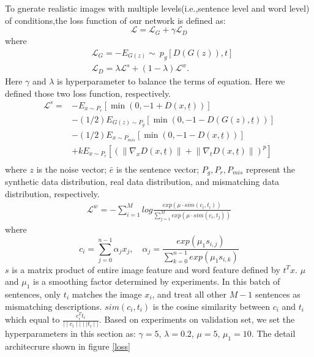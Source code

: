 \documentclass[runningheads, orivec]{llncs}
\begin{document}
To gnerate realistic images with multiple levels(i.e.,sentence level and word level) of conditions,the loss function of our network is defined as:
\begin{equation}
    \mathcal{L} =\mathcal{L}_{G}+ \gamma \mathcal{L}_{D}
\end{equation}
where
\begin{equation}
\begin{aligned}
        &\mathcal{L} _{G} = -E_{G(z)}\sim\ p_{g}[D(G(z)),t]\\
        &\mathcal{L}_{D} = \lambda \mathcal{L}^{s}+(1-\lambda) \mathcal{L}^{w}.
\end{aligned}
\end{equation}
Here $\gamma$  and $\lambda$ is hyperparameter to balance the terms of equation. 
Here we defined those two loss function, respectively.
\begin{equation}
\begin{aligned}
\mathcal{L}^{s}= & - E _{x \sim P _r}[\min (0,-1+D(x, \underline{t}))] \\
& -(1 / 2) E _{G(z) \sim P _g}[\min (0,-1-D(G(z), \underline{t}))] \\
& -(1 / 2) E _{x \sim P _{m i s}}[\min (0,-1-D(x, \underline{t}))] \\
& +k E _{x \sim P _r}\left[\left(\left\|\nabla_x D(x, \underline{t})\right\|+\left\|\nabla_t D(x,\underline{t})\right\|\right)^p\right] \\
\end{aligned}
\end{equation}
where $z$ is the noise vector; $\bar e$ is the sentence vector; $P_{g},P_{r},P_{mis}$ represent the synthetic data distribution, real data distribution, and mismatching data distribution, respectively.
\begin{equation}
    \begin{aligned}
        \mathcal{L}^{w} = -\sum^{M}_{i=1} log \frac{exp(\mu \cdot sim(c_{i},t_{i}))}{\sum^{M}_{j=1}exp(\mu  \cdot sim(c_{i},t_{j}))}
        \end{aligned}
\end{equation}
where
\begin{equation}
    c_{i}= \sum^{n-1}_{j=0} \alpha_{j}x_{j}, \quad \alpha_{j}=\frac{exp(\mu_{1}s_{i,j})}{\sum^{n-1}_{k=0}exp(\mu_{1}s_{i,k})}
\end{equation}
$s$ is a matrix product of entire image feature and word feature defined by $t^{T}x$. 
$\mu$ and $\mu_{1}$ is a smoothing factor determined by experiments. In this batch of sentences, only $t_{i}$ matches the image $x_{i}$, and treat all other $M-1$ sentences as mismatching descriptions. $sim(c_{i},t_{i})$ is the cosine similarity between $c_{i}$ and $t_{i}$ which equal to $\frac{c_{i}^{T}t_{i}}{\mid \mid c_{i}\mid \mid \mid \mid t_{i}\mid \mid  } $. Based on experiments on validation set, we set the hyperparameters in this section as: $\gamma=5$, $\lambda=0.2$, $\mu=5$, $\mu_{1}=10$. The detail architecrure shown in figure \ref{loss}
\vspace{-10pt}
\end{document}
